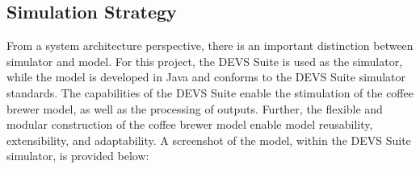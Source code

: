 \documentclass[10pt]{article}
\begin{document}



\subsection{Simulation Strategy}
From a system architecture perspective, there is an important distinction between simulator and model.  For this project, the DEVS Suite is used as the simulator, while the model is developed in Java and conforms to the DEVS Suite simulator standards.  The capabilities of the DEVS Suite enable the stimulation of the coffee brewer model, as well as the processing of outputs.  Further, the flexible and modular construction of the coffee brewer model enable model reusability, extensibility, and adaptability.  A screenshot of the model, within the DEVS Suite simulator, is provided below:
\end{document}
